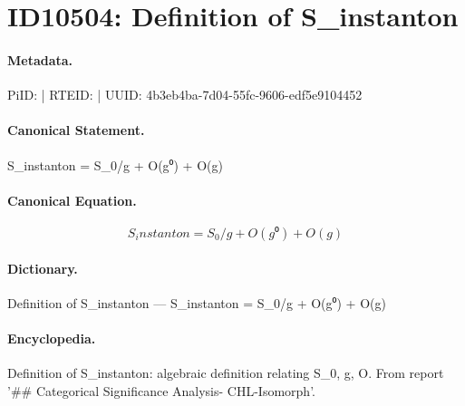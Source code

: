 \section*{ID10504: Definition of S\_instanton}
\paragraph{Metadata.}
PiID:  | RTEID:  | UUID: 4b3eb4ba-7d04-55fc-9606-edf5e9104452

\paragraph{Canonical Statement.}
S\_instanton = S\_0/g + O(g⁰) + O(g)

\paragraph{Canonical Equation.}
\[
S_instanton = S_0/g + O(g⁰) + O(g)
\]

\paragraph{Dictionary.}
Definition of S\_instanton — S\_instanton = S\_0/g + O(g⁰) + O(g)

\paragraph{Encyclopedia.}
Definition of S\_instanton: algebraic definition relating S\_0, g, O. From report '\#\# Categorical Significance Analysis- CHL-Isomorph'.
